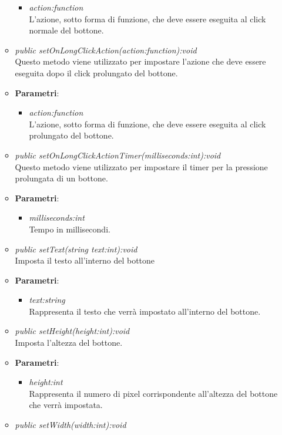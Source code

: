 \begin{itemize}
\begin{itemize}
{\begin{itemize}
		\item \textit{action:function}\\
		L'azione, sotto forma di funzione, che deve essere eseguita al click normale del bottone.
		\end{itemize}}
	\item \textit{public setOnLongClickAction(action:function):void}\\
		Questo metodo viene utilizzato per impostare l'azione che deve essere eseguita dopo il click prolungato del bottone.
		\item{\textbf{Parametri}: \begin{itemize}
		\item \textit{action:function}\\
		L'azione, sotto forma di funzione, che deve essere eseguita al click prolungato del bottone.
		\end{itemize}}
		\item \textit{public setOnLongClickActionTimer(milliseconds:int):void}\\
		Questo metodo viene utilizzato per impostare il timer per la pressione prolungata di un bottone.
				\item{\textbf{Parametri}: \begin{itemize}
				\item \textit{milliseconds:int}\\
				Tempo in millisecondi.
	\end{itemize}}
	\item \textit{public setText(string text:int):void}\\
	Imposta il testo all'interno del bottone
		\item{\textbf{Parametri}: \begin{itemize}
		\item \textit{text:string}\\
		Rappresenta il testo che verrà impostato all'interno del bottone.
		\end{itemize}}
	\item \textit{public setHeight(height:int):void}\\
	Imposta l'altezza del bottone.
		\item{\textbf{Parametri}: \begin{itemize}
		\item \textit{height:int}\\
		Rappresenta il numero di pixel corrispondente all'altezza del bottone che verrà impostata.
		\end{itemize}}
	\item \textit{public setWidth(width:int):void}\\

\end{itemize}
\end{itemize}
